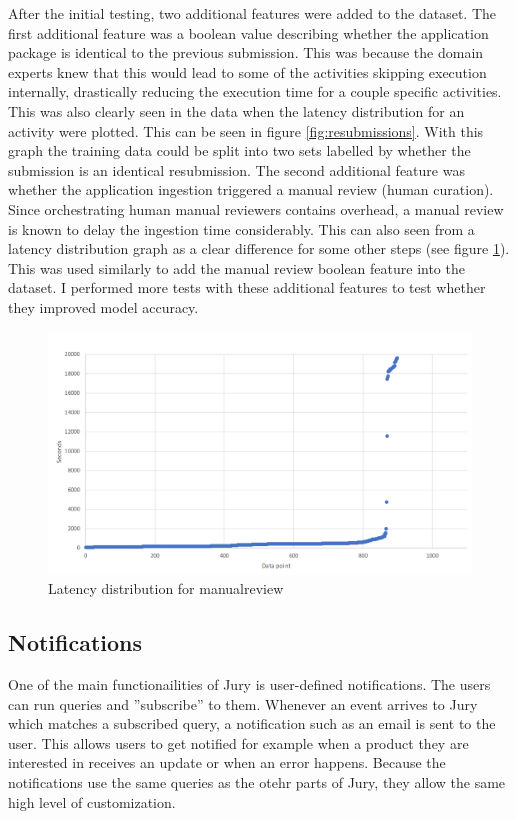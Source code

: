 After the initial testing, two additional features were added to the dataset.
The first additional feature was a boolean value describing whether the application package is identical to the previous submission.
This was because the domain experts knew that this would lead to some of the activities skipping execution internally, drastically reducing the execution time for a couple specific activities. 
This was also clearly seen in the data when the latency distribution for an activity were plotted. 
This can be seen in figure \ref{fig:resubmissions}. 
With this graph the training data could be split into two sets labelled by whether the submission is an identical resubmission.
The second additional feature was whether the application ingestion triggered a manual review (human curation). 
Since orchestrating human manual reviewers contains overhead, a manual review is known to delay the ingestion time considerably.
This can also seen from a latency distribution graph as a clear difference for some other steps (see figure \ref{fig:manualreview}).
This was used similarly to add the manual review boolean feature into the dataset.
I performed more tests with these additional features to test whether they improved model accuracy.

\begin{figure}[htb]
    \centering \includegraphics[width=0.6\linewidth]{gfx/manualreview.png}
    \caption{Latency distribution for manualreview }
    \label{fig:manualreview}
\end{figure}

\subsection{Notifications}
\label{sec:notifications}

One of the main functionailities of Jury is user-defined notifications.
The users can run queries and ''subscribe'' to them.
Whenever an event arrives to Jury which matches a subscribed query, a notification such as an email is sent to the user.
This allows users to get notified for example when a product they are interested in receives an update or when an error happens.
Because the notifications use the same queries as the otehr parts of Jury, they allow the same high level of customization.

